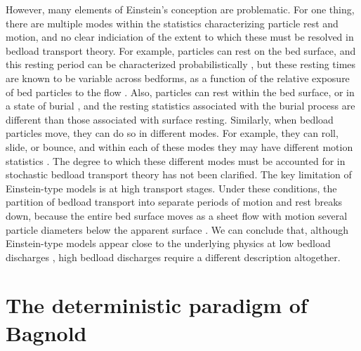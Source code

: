 \documentclass{article}
\begin{document}
However, many elements of Einstein's conception are problematic. 
For one thing, there are multiple modes within the statistics characterizing particle rest and motion, and no clear indiciation of the extent to which these must be resolved in bedload transport theory. 
For example, particles can rest on the bed surface, and this resting period can be characterized probabilistically \citep{Einstein1950}, but these resting times are known to be variable across bedforms, as a function of the relative exposure of bed particles to the flow \citep{Crickmore1962, Sayre1967, Yang1971, Nakagawa1980}. 
Also, particles can rest within the bed surface, or in a state of burial \citep{Voepel2013, Martin2014, Olinde2015, Bradley2017}, and the resting statistics associated with the burial process are different than those associated with surface resting. 
Similarly, when bedload particles move, they can do so in different modes. 
For example, they can roll, slide, or bounce, and within each of these modes they may have different motion statistics \citep{Bohm2004, Frey2006, Frey2014}. 
The degree to which these different modes must be accounted for in stochastic bedload transport theory has not been clarified.  
The key limitation of Einstein-type models is at high transport stages. 
Under these conditions, the partition of bedload transport into separate periods of motion and rest breaks down, because the entire bed surface moves as a sheet flow with motion several particle diameters below the apparent surface \citep{Jenkins1998, Mouilleron2009, Houssais2015}. 
We can conclude that, although Einstein-type models appear close to the underlying physics at low bedload discharges \citep{Ancey2008, Heyman2013, Ma2014}, high bedload discharges require a different description altogether.  

\section{The deterministic paradigm of Bagnold} 
\end{document}
